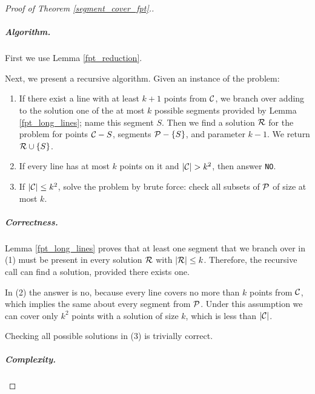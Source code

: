 \begin{proof}[Proof of Theorem \ref{segment_cover_fpt}.]\leavevmode



\subparagraph{Algorithm.}
First we use Lemma \ref{fpt_reduction}.

Next, we present a recursive algorithm. Given an instance of the problem:

\begin{enumerate}[label={(\arabic*)}]
\item If there exist a line with at least $k+1$ points from $\mathcal{C}$, we branch over
adding to the solution one of the at most $k$ possible segments
provided by Lemma \ref{fpt_long_lines}; name this segment $S$.
Then we find a solution $\mathcal{R}$
for the problem for points $\mathcal{C} - S$, segments $\mathcal{P} - \{S\}$,
and parameter $k-1$. We return $\mathcal{R} \cup \{S\}$.
\item If every line has at most $k$ points on it and $|\mathcal{C}| > k^2$,
then answer \texttt{NO}.
\item If $|\mathcal{C}| \le k^2$, solve the problem by brute force:
check all subsets of $\mathcal{P}$ of size at most $k$.
\end{enumerate}

\subparagraph{Correctness.}

Lemma \ref{fpt_long_lines} proves that at least one segment that we
branch over in (1) must be present in every solution $\mathcal{R}$ with $|\mathcal{R}| \le k$.
Therefore, the recursive call can find a solution, provided there exists one.

In (2) the answer is no, because every line covers no more than $k$ points
from $\mathcal{C}$, which implies the same about every segment from $\mathcal{P}$.
Under this assumption
we can cover only $k^2$ points with a solution of size $k$, which is less
than $|\mathcal{C}|$.

Checking all possible solutions in (3) is trivially correct.


\subparagraph{Complexity.}


\end{proof}
